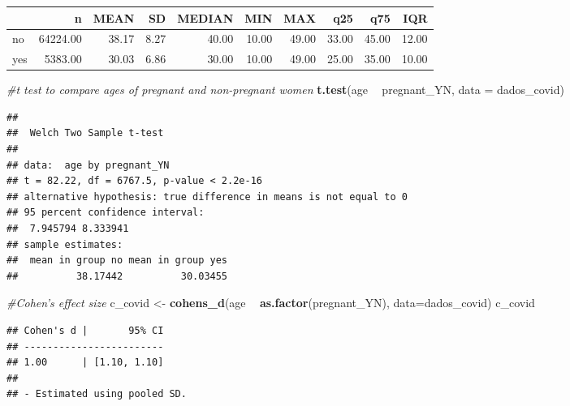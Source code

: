 \documentclass[
]{article}
\newenvironment{Shaded}{\begin{snugshade}}{\end{snugshade}}
\newcommand{\CommentTok}[1]{\textcolor[rgb]{0.56,0.35,0.01}{\textit{#1}}}
\newcommand{\DataTypeTok}[1]{\textcolor[rgb]{0.13,0.29,0.53}{#1}}
\newcommand{\KeywordTok}[1]{\textcolor[rgb]{0.13,0.29,0.53}{\textbf{#1}}}
\newcommand{\NormalTok}[1]{#1}
\newcommand{\OperatorTok}[1]{\textcolor[rgb]{0.81,0.36,0.00}{\textbf{#1}}}
\newcommand{\StringTok}[1]{\textcolor[rgb]{0.31,0.60,0.02}{#1}}
\begin{document}
\begin{longtable}[]{@{}lrrrrrrrrr@{}}
\toprule
& n & MEAN & SD & MEDIAN & MIN & MAX & q25 & q75 & IQR\tabularnewline
\midrule
\endhead
no & 64224.00 & 38.17 & 8.27 & 40.00 & 10.00 & 49.00 & 33.00 & 45.00 &
12.00\tabularnewline
yes & 5383.00 & 30.03 & 6.86 & 30.00 & 10.00 & 49.00 & 25.00 & 35.00 &
10.00\tabularnewline
\bottomrule
\end{longtable}

\begin{Shaded}
\begin{Highlighting}[]
\CommentTok{#t test to compare ages of pregnant and non-pregnant women}
\KeywordTok{t.test}\NormalTok{(age }\OperatorTok{~}\StringTok{ }\NormalTok{pregnant_YN, }\DataTypeTok{data =}\NormalTok{ dados_covid)}
\end{Highlighting}
\end{Shaded}

\begin{verbatim}
## 
##  Welch Two Sample t-test
## 
## data:  age by pregnant_YN
## t = 82.22, df = 6767.5, p-value < 2.2e-16
## alternative hypothesis: true difference in means is not equal to 0
## 95 percent confidence interval:
##  7.945794 8.333941
## sample estimates:
##  mean in group no mean in group yes 
##          38.17442          30.03455
\end{verbatim}

\begin{Shaded}
\begin{Highlighting}[]
\CommentTok{#Cohen's effect size}
\NormalTok{c_covid <-}\StringTok{ }\KeywordTok{cohens_d}\NormalTok{(age }\OperatorTok{~}\StringTok{ }\KeywordTok{as.factor}\NormalTok{(pregnant_YN), }\DataTypeTok{data=}\NormalTok{dados_covid)}
\NormalTok{c_covid}
\end{Highlighting}
\end{Shaded}

\begin{verbatim}
## Cohen's d |       95% CI
## ------------------------
## 1.00      | [1.10, 1.10]
## 
## - Estimated using pooled SD.
\end{verbatim}

\begin{Shaded}
\end{Shaded}
\end{document}
